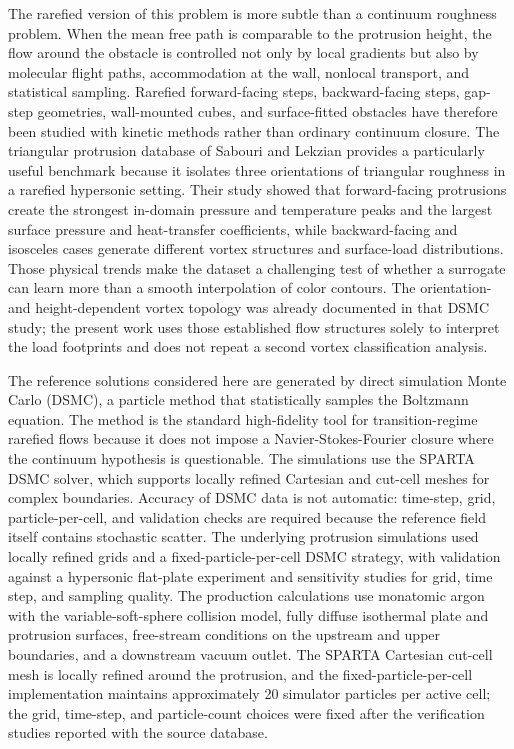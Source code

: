\documentclass[aip,pof,preprint,floatfix,amsmath,amssymb]{revtex4-2}
\begin{document}
The rarefied version of this problem is more subtle than a continuum roughness problem. When the mean free path is comparable to the protrusion height, the flow around the obstacle is controlled not only by local gradients but also by molecular flight paths, accommodation at the wall, nonlocal transport, and statistical sampling. Rarefied forward-facing steps, backward-facing steps, gap-step geometries, wall-mounted cubes, and surface-fitted obstacles have therefore been studied with kinetic methods rather than ordinary continuum closure.\cite{PullinHarvey1977,LeiteSantos2015,NabapureMurthy2019,WangFang2020,NabapureMurthy2021,ManelaGibelli2020,Gavasane2018,MahdaviRoohi2022,SabouriLekzian2025} The triangular protrusion database of Sabouri and Lekzian provides a particularly useful benchmark because it isolates three orientations of triangular roughness in a rarefied hypersonic setting.\cite{SabouriLekzian2026} Their study showed that forward-facing protrusions create the strongest in-domain pressure and temperature peaks and the largest surface pressure and heat-transfer coefficients, while backward-facing and isosceles cases generate different vortex structures and surface-load distributions. Those physical trends make the dataset a challenging test of whether a surrogate can learn more than a smooth interpolation of color contours. The orientation- and height-dependent vortex topology was already documented in that DSMC study; the present work uses those established flow structures solely to interpret the load footprints and does not repeat a second vortex classification analysis.

The reference solutions considered here are generated by direct simulation Monte Carlo (DSMC), a particle method that statistically samples the Boltzmann equation. The method is the standard high-fidelity tool for transition-regime rarefied flows because it does not impose a Navier-Stokes-Fourier closure where the continuum hypothesis is questionable.\cite{Boyd2017,Stefanov2019} The simulations use the SPARTA DSMC solver, which supports locally refined Cartesian and cut-cell meshes for complex boundaries.\cite{Plimpton2019} Accuracy of DSMC data is not automatic: time-step, grid, particle-per-cell, and validation checks are required because the reference field itself contains stochastic scatter. The underlying protrusion simulations used locally refined grids and a fixed-particle-per-cell DSMC strategy, with validation against a hypersonic flat-plate experiment and sensitivity studies for grid, time step, and sampling quality.\cite{Becker1974,Sun2011PPC,Shamseddine2019,Sabouri2024FPPC} The production calculations use monatomic argon with the variable-soft-sphere collision model, fully diffuse isothermal plate and protrusion surfaces, free-stream conditions on the upstream and upper boundaries, and a downstream vacuum outlet. The SPARTA Cartesian cut-cell mesh is locally refined around the protrusion, and the fixed-particle-per-cell implementation maintains approximately 20 simulator particles per active cell; the grid, time-step, and particle-count choices were fixed after the verification studies reported with the source database.\cite{SabouriLekzian2026}
\end{document}
